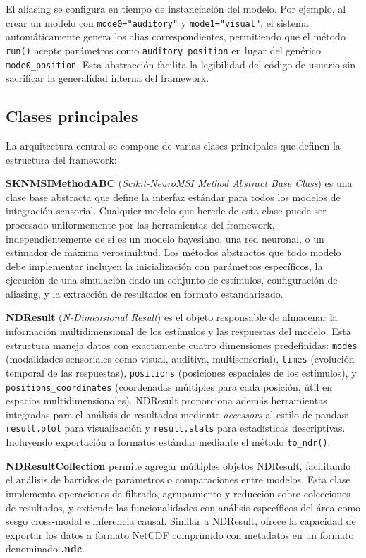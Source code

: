 El aliasing se configura en tiempo de instanciación del modelo. Por ejemplo, al crear un modelo con \texttt{mode0="auditory"} y \texttt{mode1="visual"}, el sistema automáticamente genera los alias correspondientes, permitiendo que el método \texttt{run()} acepte parámetros como \texttt{auditory\_position} en lugar del genérico \texttt{mode0\_position}. Esta abstracción facilita la legibilidad del código de usuario sin sacrificar la generalidad interna del framework.

\subsection{Clases principales}
\label{subsec:snmsi_clases}

La arquitectura central se compone de varias clases principales que definen la estructura del framework:

\textbf{SKNMSIMethodABC} (\textit{Scikit-NeuroMSI Method Abstract Base Class}) es una clase base abstracta que define la interfaz estándar para todos los modelos de integración sensorial. Cualquier modelo que herede de esta clase puede ser procesado uniformemente por las herramientas del framework, independientemente de si es un modelo bayesiano, una red neuronal, o un estimador de máxima verosimilitud. Los métodos abstractos que todo modelo debe implementar incluyen la inicialización con parámetros específicos, la ejecución de una simulación dado un conjunto de estímulos, configuración de aliasing, y la extracción de resultados en formato estandarizado.

\textbf{NDResult} (\textit{N-Dimensional Result}) es el objeto responsable de almacenar la información multidimensional de los estímulos y las respuestas del modelo. Esta estructura maneja datos con exactamente cuatro dimensiones predefinidas: \texttt{modes} (modalidades sensoriales como visual, auditiva, multisensorial), \texttt{times} (evolución temporal de las respuestas), \texttt{positions} (posiciones espaciales de los estímulos), y \texttt{positions\_coordinates} (coordenadas múltiples para cada posición, útil en espacios multidimensionales). 
NDResult proporciona además herramientas integradas para el análisis de resultados mediante \textit{accessors} al estilo de pandas: \texttt{result.plot} para visualización y \texttt{result.stats} para estadísticas descriptivas. Incluyendo exportación a formatos estándar mediante el método \texttt{to\_ndr()}.

\textbf{NDResultCollection} permite agregar múltiples objetos NDResult, facilitando el análisis de barridos de parámetros o comparaciones entre modelos. Esta clase implementa operaciones de filtrado, agrupamiento y reducción sobre colecciones de resultados, y extiende las funcionalidades con análisis específicos del área como sesgo cross-modal e inferencia causal. Similar a NDResult, ofrece la capacidad de exportar los datos a formato NetCDF comprimido con metadatos en un formato denominado \textbf{.ndc}.

